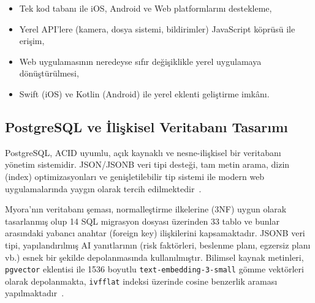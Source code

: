 \begin{itemize}
    \item Tek kod tabanı ile iOS, Android ve Web platformlarını destekleme,
    \item Yerel API'lere (kamera, dosya sistemi, bildirimler) JavaScript köprüsü ile erişim,
    \item Web uygulamasının neredeyse sıfır değişiklikle yerel uygulamaya dönüştürülmesi,
    \item Swift (iOS) ve Kotlin (Android) ile yerel eklenti geliştirme imkânı.
\end{itemize}

\subsection{PostgreSQL ve İlişkisel Veritabanı Tasarımı}

PostgreSQL, ACID uyumlu, açık kaynaklı ve nesne-ilişkisel bir veritabanı yönetim sistemidir. JSON/JSONB veri tipi desteği, tam metin arama, dizin (index) optimizasyonları ve genişletilebilir tip sistemi ile modern web uygulamalarında yaygın olarak tercih edilmektedir~\cite{PostgreSQL2024}.

Myora'nın veritabanı şeması, normalleştirme ilkelerine (3NF) uygun olarak tasarlanmış olup 14 SQL migrasyon dosyası üzerinden 33 tablo ve bunlar arasındaki yabancı anahtar (foreign key) ilişkilerini kapsamaktadır. JSONB veri tipi, yapılandırılmış AI yanıtlarının (risk faktörleri, beslenme planı, egzersiz planı vb.) esnek bir şekilde depolanmasında kullanılmıştır. Bilimsel kaynak metinleri, \texttt{pgvector} eklentisi ile 1536 boyutlu \texttt{text-embedding-3-small} gömme vektörleri olarak depolanmakta, \texttt{ivfflat} indeksi üzerinde cosine benzerlik araması yapılmaktadır~\cite{pgvector2024}.
